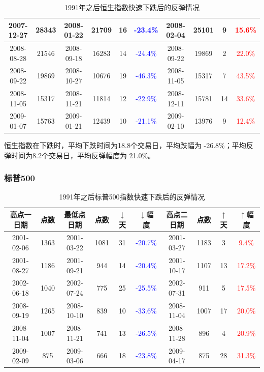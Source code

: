 \documentclass[12pt,a4paper]{article}
\begin{document}
\begin{table}[H]
\begin{tabular}{|c|c|c|c|c|c|c|c|c|c|}
2007-12-27 & 28343 & 2008-01-22 & 21709 & 16 & \textcolor{blue}{-23.4\%} & 2008-02-04 & 25101 & 9 & \textcolor{red}{15.6\%}  \\  \hline
2008-08-28 & 21546 & 2008-09-18 & 16283 & 14 & \textcolor{blue}{-24.4\%} & 2008-09-22 & 19869 & 2 & \textcolor{red}{22.0\%}  \\  \hline
2008-09-22 & 19869 & 2008-10-27 & 10676 & 19 & \textcolor{blue}{-46.3\%} & 2008-11-05 & 15317 & 7 & \textcolor{red}{43.5\%}  \\  \hline
2008-11-05 & 15317 & 2008-11-21 & 11814 & 12 & \textcolor{blue}{-22.9\%} & 2008-12-11 & 15781 & 14 & \textcolor{red}{33.6\%}  \\  \hline
2009-01-07 & 15763 & 2009-01-21 & 12439 & 10 & \textcolor{blue}{-21.1\%} & 2009-02-10 & 13976 & 9 & \textcolor{red}{12.4\%}  \\  \hline


\end{tabular}
\caption{1991年之后恒生指数快速下跌后的反弹情况}
\end{table}

恒生指数在下跌时，平均下跌时间为18.8个交易日，平均跌幅为 -26.8\%；平均反弹时间为8.2个交易日，平均反弹幅度为 21.0\%。

\subsubsection{标普500}


\begin{table}[H]
\centering  %
\begin{tabular}{|c|c|c|c|c|c|c|c|c|c|}  %
\hline

高点一日期 & 点数 & 最低点日期 & 点数 & $\downarrow$ 天 &$\downarrow$幅度 & 高点二日期 & 点数 & $\uparrow$天& $\uparrow$幅度 \\ \hline
2001-02-06 & 1363 & 2001-03-22 & 1081 & 31 & \textcolor{blue}{-20.7\%} & 2001-03-27 & 1183 & 3 & \textcolor{red}{9.4\%}  \\  \hline
2001-08-27 & 1186 & 2001-09-21 & 944 & 14 & \textcolor{blue}{-20.4\%} & 2001-10-17 & 1107 & 13 & \textcolor{red}{17.2\%}  \\  \hline
2002-06-18 & 1040 & 2002-07-24 & 775 & 25 & \textcolor{blue}{-25.5\%} & 2002-07-31 & 911 & 5 & \textcolor{red}{17.5\%}  \\  \hline
2008-09-19 & 1265 & 2008-10-10 & 839 & 10 & \textcolor{blue}{-33.6\%} & 2008-11-04 & 1007 & 17 & \textcolor{red}{20.0\%}  \\  \hline
2008-11-04 & 1007 & 2008-11-21 & 741 & 13 & \textcolor{blue}{-26.5\%} & 2008-11-28 & 896 & 4 & \textcolor{red}{20.9\%}  \\  \hline
2009-02-09 & 875 & 2009-03-06 & 666 & 18 & \textcolor{blue}{-23.8\%} & 2009-04-17 & 875 & 28 & \textcolor{red}{31.3\%}  \\  \hline



\end{tabular}
\caption{1991年之后标普500指数快速下跌后的反弹情况}
\end{table}
\end{document}
